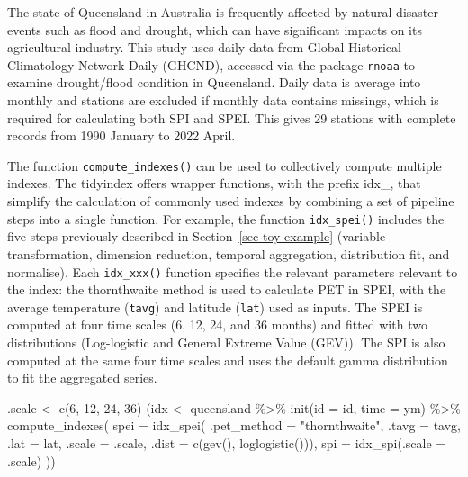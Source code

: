 \documentclass[
]{article}
\newenvironment{Shaded}{\begin{snugshade}}{\end{snugshade}}
\newcommand{\AttributeTok}[1]{\textcolor[rgb]{0.40,0.45,0.13}{#1}}
\newcommand{\DecValTok}[1]{\textcolor[rgb]{0.68,0.00,0.00}{#1}}
\newcommand{\FunctionTok}[1]{\textcolor[rgb]{0.28,0.35,0.67}{#1}}
\newcommand{\NormalTok}[1]{\textcolor[rgb]{0.00,0.23,0.31}{#1}}
\newcommand{\OtherTok}[1]{\textcolor[rgb]{0.00,0.23,0.31}{#1}}
\newcommand{\SpecialCharTok}[1]{\textcolor[rgb]{0.37,0.37,0.37}{#1}}
\newcommand{\StringTok}[1]{\textcolor[rgb]{0.13,0.47,0.30}{#1}}
\begin{document}
The state of Queensland in Australia is frequently affected by natural
disaster events such as flood and drought, which can have significant
impacts on its agricultural industry. This study uses daily data from
Global Historical Climatology Network Daily (GHCND), accessed via the
package \texttt{rnoaa} to examine drought/flood condition in Queensland.
Daily data is average into monthly and stations are excluded if monthly
data contains missings, which is required for calculating both SPI and
SPEI. This gives 29 stations with complete records from 1990 January to
2022 April.

The function \texttt{compute\_indexes()} can be used to collectively
compute multiple indexes. The tidyindex offers wrapper functions, with
the prefix idx\_, that simplify the calculation of commonly used indexes
by combining a set of pipeline steps into a single function. For
example, the function \texttt{idx\_spei()} includes the five steps
previously described in Section~\ref{sec-toy-example} (variable
transformation, dimension reduction, temporal aggregation, distribution
fit, and normalise). Each \texttt{idx\_xxx()} function specifies the
relevant parameters relevant to the index: the thornthwaite method is
used to calculate PET in SPEI, with the average temperature
(\texttt{tavg}) and latitude (\texttt{lat}) used as inputs. The SPEI is
computed at four time scales (6, 12, 24, and 36 months) and fitted with
two distributions (Log-logistic and General Extreme Value (GEV)). The
SPI is also computed at the same four time scales and uses the default
gamma distribution to fit the aggregated series.

\begin{Shaded}
\begin{Highlighting}[]
\NormalTok{.scale }\OtherTok{\textless{}{-}} \FunctionTok{c}\NormalTok{(}\DecValTok{6}\NormalTok{, }\DecValTok{12}\NormalTok{, }\DecValTok{24}\NormalTok{, }\DecValTok{36}\NormalTok{)}
\NormalTok{(idx }\OtherTok{\textless{}{-}}\NormalTok{ queensland }\SpecialCharTok{\%\textgreater{}\%}
  \FunctionTok{init}\NormalTok{(}\AttributeTok{id =}\NormalTok{ id, }\AttributeTok{time =}\NormalTok{ ym) }\SpecialCharTok{\%\textgreater{}\%}
  \FunctionTok{compute\_indexes}\NormalTok{(}
    \AttributeTok{spei =} \FunctionTok{idx\_spei}\NormalTok{(}
      \AttributeTok{.pet\_method =} \StringTok{"thornthwaite"}\NormalTok{, }\AttributeTok{.tavg =}\NormalTok{ tavg, }\AttributeTok{.lat =}\NormalTok{ lat,}
      \AttributeTok{.scale =}\NormalTok{ .scale, }\AttributeTok{.dist =} \FunctionTok{c}\NormalTok{(}\FunctionTok{gev}\NormalTok{(), }\FunctionTok{loglogistic}\NormalTok{())),}
    \AttributeTok{spi =} \FunctionTok{idx\_spi}\NormalTok{(}\AttributeTok{.scale =}\NormalTok{ .scale)}
\NormalTok{  ))}
\end{Highlighting}
\end{Shaded}
\end{document}
